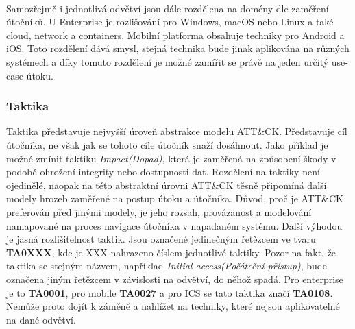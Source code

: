 \paragraph{}
Samozřejmě i jednotlivá odvětví jsou dále rozdělena na domény dle zaměření útočníků.
U Enterprise je rozlišování pro Windows, macOS nebo Linux a také cloud, network a containers.
Mobilní platforma obsahuje techniky pro Android a iOS\@.
Toto rozdělení dává smysl, stejná technika bude jinak aplikována na různých systémech a díky tomuto rozdělení je možné zamířit se právě na jeden určitý use-case útoku.

\subsubsection{Taktika}
Taktika představuje nejvyšší úroveň abstrakce modelu ATT\&CK\@.
Představuje cíl útočníka, ne však jak se tohoto cíle útočník snaží dosáhnout.
Jako příklad je možné zmínit taktiku \textit{Impact(Dopad)}, která je zaměřená na způsobení škody v podobě ohrožení integrity nebo dostupnosti dat.
Rozdělení na taktiky není ojedinělé, naopak na této abstraktní úrovni ATT\&CK těsně připomíná další modely hrozeb zaměřené na postup útoku a útočníka.
Důvod, proč je ATT\&CK preferován před jinými modely, je jeho rozsah, provázanost a modelování namapované na proces navigace útočníka v napadaném systému.
Další výhodou je jasná rozlišitelnost taktik.
Jsou označené jedinečným řetězcem ve tvaru \textbf{TA0XXX}, kde je XXX nahrazeno číslem jednotlivé taktiky.
Pozor na fakt, že taktika se stejným názvem, například \textit{Initial access(Počáteční přístup)}, bude označena jiným řetězcem v závislosti na odvětví, do něhož spadá.
Pro enterprise je to \textbf{TA0001}, pro mobile \textbf{TA0027} a pro ICS se tato taktika značí \textbf{TA0108}.
Nemůže proto dojít k záměně a nahlížet na techniky, které nejsou aplikovatelné na dané odvětví.\cite{Mitre_finding_cyber_threats, mitre_attack_framework}

